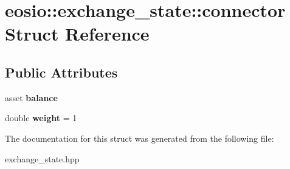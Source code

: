 \hypertarget{structeosio_1_1exchange__state_1_1connector}{}\section{eosio\+:\+:exchange\+\_\+state\+:\+:connector Struct Reference}
\label{structeosio_1_1exchange__state_1_1connector}
\subsection*{Public Attributes}
\begin{DoxyCompactItemize}
\item 
\mbox{\label{structeosio_1_1exchange__state_1_1connector_a43db131eff6f224b210e69b6fe7632d2}} 
asset {\bfseries balance}
\item 
\mbox{\label{structeosio_1_1exchange__state_1_1connector_aafdae580851779594e044bf022198bdc}} 
double {\bfseries weight} = 1
\end{DoxyCompactItemize}


The documentation for this struct was generated from the following file\+:\begin{DoxyCompactItemize}
\item 
exchange\+\_\+state.\+hpp\end{DoxyCompactItemize}
